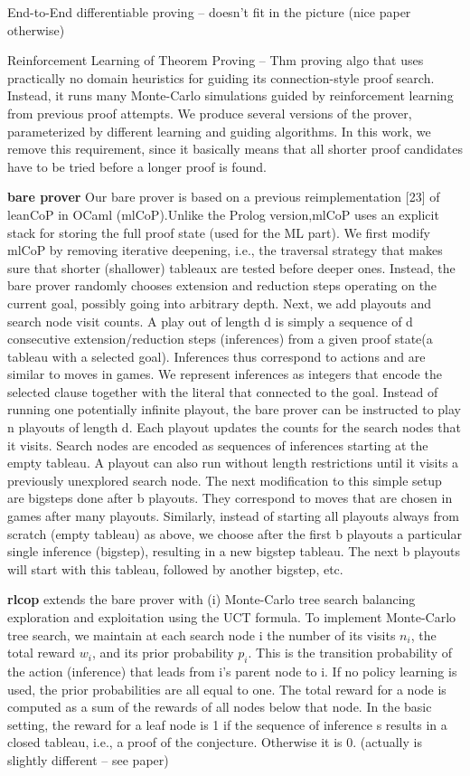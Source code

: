 \documentclass{article}
\begin{document}
End-to-End differentiable proving \cite{EndToEndDiffProving} -- doesn't fit in
the picture (nice paper otherwise)

Reinforcement Learning of Theorem Proving \cite{RLTP} -- Thm proving algo that
uses practically no domain heuristics for guiding its connection-style proof
search. Instead, it runs many Monte-Carlo simulations guided by reinforcement
learning from previous proof attempts. We produce several versions of the
prover, parameterized by different learning and guiding algorithms. In this work, we remove this requirement, since it basically means that all shorter proof candidates have to be tried before a longer proof is found.

\textbf{bare prover} Our bare prover is based on a previous reimplementation
[23] of leanCoP in OCaml (mlCoP).Unlike the Prolog version,mlCoP uses an
explicit stack for storing the full proof state (used for the ML part).  We
first modify mlCoP by removing iterative deepening, i.e., the traversal
strategy that makes sure that shorter (shallower) tableaux are  tested  before
deeper  ones.   Instead,  the  bare  prover  randomly  chooses  extension  and
reduction steps operating on the current goal, possibly going into arbitrary
depth. Next, we add playouts and search node visit counts. A play out of length
d is simply a sequence of d consecutive extension/reduction steps (inferences)
from a given proof state(a tableau with a selected goal). Inferences  thus
correspond  to actions and  are  similar  to  moves  in  games.   We  represent
inferences as integers that encode the selected clause together with the
literal that connected to the goal.  Instead of running one potentially
infinite playout, the bare prover can be instructed to play n playouts of
length d. Each playout updates the counts for the search nodes that it visits.
Search nodes are encoded as sequences of inferences starting at the empty
tableau. A playout can also run without length restrictions until it visits
a previously unexplored search node. The  next  modification  to  this  simple
setup  are bigsteps done  after b playouts.   They  correspond to moves that
are chosen in games after many playouts.  Similarly, instead of starting all
playouts always from scratch (empty tableau) as above, we choose after the
first b playouts a particular single inference  (bigstep),  resulting  in
a  new bigstep  tableau.   The  next b playouts  will  start  with  this
tableau, followed by another bigstep, etc.

\textbf{rlcop} extends the bare prover with (i) Monte-Carlo tree search balancing exploration and exploitation using the UCT formula. To implement Monte-Carlo tree search, we maintain at each search node i the number of its visits $n_i$, the total reward $w_i$, and its prior probability $p_i$. This is the transition probability of the action (inference) that leads from i's parent node to i. If no policy learning is used, the prior probabilities are all equal to one. The total reward for a node is computed as a sum of the rewards of all nodes below that node. In the basic setting, the reward for a leaf node is 1 if the sequence of inference s results in a closed tableau, i.e., a proof of the conjecture. Otherwise it is 0. (actually is slightly different -- see paper)
\end{document}
